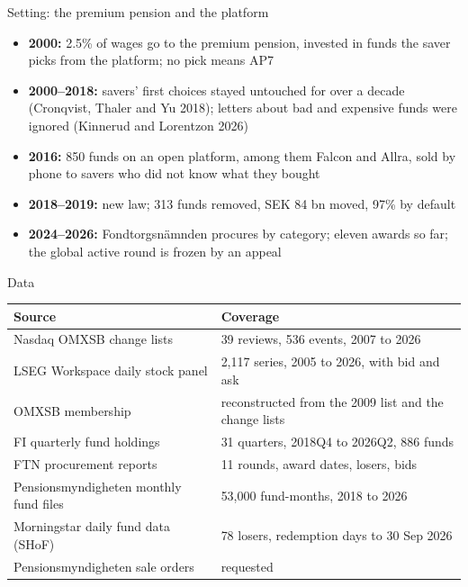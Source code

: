 \documentclass[aspectratio=169]{beamer}
\begin{document}
\begin{frame}{Setting: the premium pension and the platform}
  \begin{itemize}
    \item \textbf{2000:} 2.5\% of wages go to the premium pension, invested in funds the
      saver picks from the platform; no pick means AP7
    \item \textbf{2000--2018:} savers' first choices stayed untouched for over a decade
      (Cronqvist, Thaler and Yu 2018); letters about bad and expensive funds were
      ignored (Kinnerud and Lorentzon 2026)
    \item \textbf{2016:} 850 funds on an open platform, among them Falcon and Allra,
      sold by phone to savers who did not know what they bought
    \item \textbf{2018--2019:} new law; 313 funds removed, SEK 84 bn moved, 97\% by default
    \item \textbf{2024--2026:} Fondtorgsnämnden procures by category; eleven awards so
      far; the global active round is frozen by an appeal
  \end{itemize}
\end{frame}

\begin{frame}{Data}
  \centering\footnotesize
  \begin{tabular}{ll}
    \toprule
    Source & Coverage \\
    \midrule
    Nasdaq OMXSB change lists & 39 reviews, 536 events, 2007 to 2026 \\
    LSEG Workspace daily stock panel & 2,117 series, 2005 to 2026, with bid and ask \\
    OMXSB membership & reconstructed from the 2009 list and the change lists \\
    FI quarterly fund holdings & 31 quarters, 2018Q4 to 2026Q2, 886 funds \\
    FTN procurement reports & 11 rounds, award dates, losers, bids \\
    Pensionsmyndigheten monthly fund files & 53,000 fund-months, 2018 to 2026 \\
    Morningstar daily fund data (SHoF) & 78 losers, redemption days to 30 Sep 2026 \\
    Pensionsmyndigheten sale orders & requested \\
    \bottomrule
  \end{tabular}
\end{frame}
\end{document}
